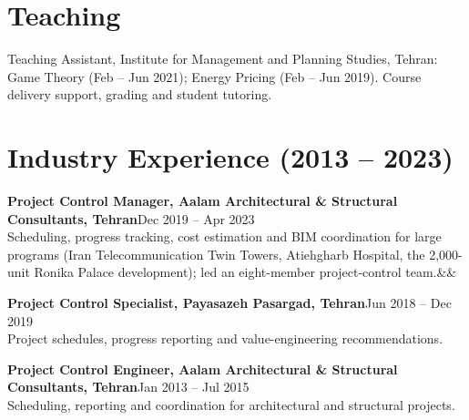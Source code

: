 \documentclass[10pt,letterpaper]{article}
\newcommand{\entry}[4]{%
  {\bfseries #1}\hfill{\color{muted}#2}\\
  {#3}\ifx&#4&\else\hfill{\color{muted}#4}\fi\par\vspace{1pt}}
\begin{document}
\section{Teaching}
\begingroup\small
Teaching Assistant, Institute for Management and Planning Studies, Tehran: Game Theory (Feb -- Jun 2021); Energy Pricing (Feb -- Jun 2019). Course delivery support, grading and student tutoring.
\endgroup

\section{Industry Experience (2013 -- 2023)}
\begingroup\small
\entry{Project Control Manager, Aalam Architectural \& Structural Consultants, Tehran}{Dec 2019 -- Apr 2023}{Scheduling, progress tracking, cost estimation and BIM coordination for large programs (Iran Telecommunication Twin Towers, Atiehgharb Hospital, the 2,000-unit Ronika Palace development); led an eight-member project-control team.}{}
\vspace{2pt}
\textbf{Project Control Specialist, Payasazeh Pasargad, Tehran}\hfill{\color{muted}Jun 2018 -- Dec 2019}\\
Project schedules, progress reporting and value-engineering recommendations.\par\vspace{2pt}
\textbf{Project Control Engineer, Aalam Architectural \& Structural Consultants, Tehran}\hfill{\color{muted}Jan 2013 -- Jul 2015}\\
Scheduling, reporting and coordination for architectural and structural projects.
\endgroup
\end{document}
